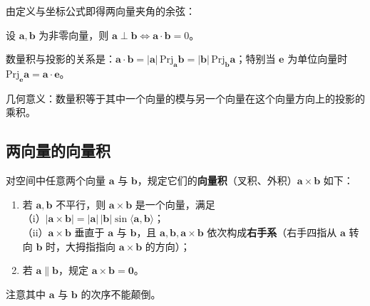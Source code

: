 由定义与坐标公式即得两向量夹角的余弦：


\begin{theorem}[垂直的充要条件]
设 $\boldsymbol{a},\boldsymbol{b}$ 为非零向量，则 $\boldsymbol{a}\perp\boldsymbol{b}\iff\boldsymbol{a}\cdot\boldsymbol{b}=0$。
\end{theorem}

数量积与投影的关系是：$\boldsymbol{a}\cdot\boldsymbol{b}=|\boldsymbol{a}|\,\mathrm{Prj}_{\boldsymbol{a}}\boldsymbol{b}=|\boldsymbol{b}|\,\mathrm{Prj}_{\boldsymbol{b}}\boldsymbol{a}$；特别当 $\boldsymbol{e}$ 为单位向量时 $\mathrm{Prj}_{\boldsymbol{e}}\boldsymbol{a}=\boldsymbol{a}\cdot\boldsymbol{e}$。

几何意义：数量积等于其中一个向量的模与另一个向量在这个向量方向上的投影的乘积。

\subsection{两向量的向量积}

\begin{definition}
对空间中任意两个向量 $\boldsymbol{a}$ 与 $\boldsymbol{b}$，规定它们的\textbf{向量积}（叉积、外积）$\boldsymbol{a}\times\boldsymbol{b}$ 如下：
\begin{enumerate}
\item 若 $\boldsymbol{a},\boldsymbol{b}$ 不平行，则 $\boldsymbol{a}\times\boldsymbol{b}$ 是一个向量，满足\\
\quad（i）$|\boldsymbol{a}\times\boldsymbol{b}|=|\boldsymbol{a}|\,|\boldsymbol{b}|\sin\langle\boldsymbol{a},\boldsymbol{b}\rangle$；\\
\quad（ii）$\boldsymbol{a}\times\boldsymbol{b}$ 垂直于 $\boldsymbol{a}$ 与 $\boldsymbol{b}$，且 $\boldsymbol{a},\boldsymbol{b},\boldsymbol{a}\times\boldsymbol{b}$ 依次构成\textbf{右手系}（右手四指从 $\boldsymbol{a}$ 转向 $\boldsymbol{b}$ 时，大拇指指向 $\boldsymbol{a}\times\boldsymbol{b}$ 的方向）；
\item 若 $\boldsymbol{a}\parallel\boldsymbol{b}$，规定 $\boldsymbol{a}\times\boldsymbol{b}=\boldsymbol{0}$。
\end{enumerate}
注意其中 $\boldsymbol{a}$ 与 $\boldsymbol{b}$ 的次序不能颠倒。
\end{definition}

